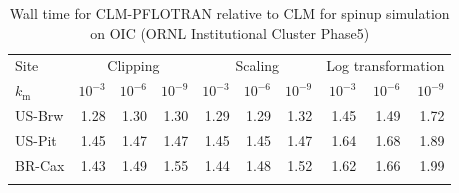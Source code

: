 \documentclass[gmd, manuscript]{copernicus}
\begin{document}
\clearpage

\begin{table}[t]
\caption{Wall time for CLM-PFLOTRAN relative to CLM for spinup simulation on OIC (ORNL Institutional Cluster Phase5)}
\label{tab:computingtime}
\begin{tabular}{lrrrrrrrrr}
\tophline
Site & \multicolumn{3}{c}{Clipping}  & \multicolumn{3}{c}{Scaling} & \multicolumn{3}{c}{Log transformation} \\
\middlehline
$k_\text{m}$ & $10^{-3}$ & $10^{-6}$ & $10^{-9}$ &  $10^{-3}$ & $10^{-6}$ & $10^{-9}$ & $10^{-3}$ & $10^{-6}$ & $10^{-9}$\\
\middlehline
US-Brw & 1.28	& 1.30 &	1.30	& 1.29	& 1.29	& 1.32	& 1.45	& 1.49	& 1.72 \\
US-Pit   & 1.45	& 1.47 &	1.47	& 1.45	& 1.45	& 1.47	& 1.64	& 1.68	& 1.89 \\
BR-Cax & 1.43	& 1.49 &	1.55	& 1.44	& 1.48	& 1.52	& 1.62	& 1.66	& 1.99 \\
\bottomhline
\end{tabular}
\end{table}


\clearpage







\end{document}
